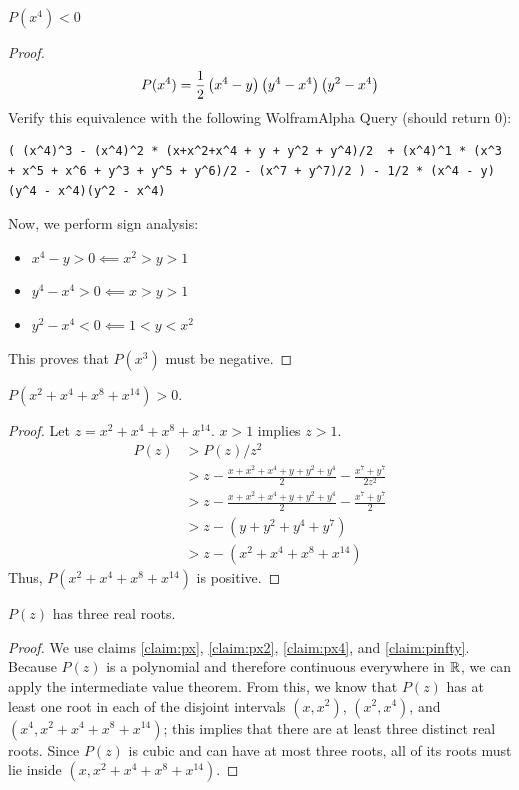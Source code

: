 \documentclass[10pt]{../usamts}
\begin{document}
\begin{solution}
\begin{claim}
    $P(x^4) < 0$
    \label{claim:px4}
\end{claim}
\begin{proof}
    $$P(x^4) = \frac{1}{2} \left( x^4-y \right) \left( y^4 - x^4 \right)\left( y^2 - x^4 \right)$$ 
    Verify this equivalence with the following WolframAlpha Query (should return $0$): 
\begin{lstlisting}
( (x^4)^3 - (x^4)^2 * (x+x^2+x^4 + y + y^2 + y^4)/2  + (x^4)^1 * (x^3 + x^5 + x^6 + y^3 + y^5 + y^6)/2 - (x^7 + y^7)/2 ) - 1/2 * (x^4 - y)(y^4 - x^4)(y^2 - x^4)
\end{lstlisting}
    Now, we perform sign analysis:
    \begin{itemize}
        \item $x^4 - y > 0 \impliedby x^2 > y > 1$
        \item $y^4 - x^4 > 0 \impliedby x > y > 1$
        \item $y^2 - x^4 < 0 \impliedby 1 < y < x^2$
    \end{itemize}
    This proves that $P(x^3)$ must be negative.
\end{proof}

\begin{claim}
    $P(x^2 + x^4 + x^8 + x^{14}) > 0$.
    \label{claim:pinfty}
\end{claim}
\begin{proof}
    Let $z = x^2 + x^4 + x^8 + x^{14}$. $x > 1$ implies $z > 1$.
    \begin{align*}
    P(z) &> P(z)/z^2 \\
         &> z - \frac{x+x^2+x^4+y+y^2+y^4}{2} - \frac{x^7+y^7}{2z^2} \\
         &> z - \frac{x+x^2+x^4+y+y^2+y^4}{2} - \frac{x^7+y^7}{2} \\
         &> z - (y + y^2 + y^4 + y^7) \\
         &> z - (x^2 + x^4 + x^8 + x^{14})
    \end{align*}
    Thus,  $P(x^2 + x^4 + x^8 + x^{14})$ is positive.
\end{proof}

\begin{claim}
    $P(z)$ has three real roots.
\end{claim}

\begin{proof}
    We use claims \ref{claim:px}, \ref{claim:px2}, \ref{claim:px4}, and \ref{claim:pinfty}.
    Because $P(z)$ is a polynomial and therefore continuous everywhere in $\mathbb{R}$, we can apply the intermediate value theorem.
    From this, we know that $P(z)$ has at least one root in each of the disjoint intervals $(x, x^2)$, $(x^2, x^4)$, and $(x^4, x^2 + x^4 + x^8 + x^{14})$; this implies that there are at least three distinct real roots. Since $P(z)$ is cubic and can have at most three roots, all of its roots must lie inside $(x,x^2 + x^4 + x^8 + x^{14})$.
\end{proof}

\end{solution}
\end{document}

